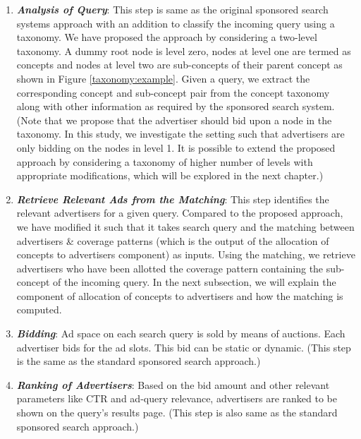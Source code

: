 \begin{enumerate}[label=(\roman*).]
\item \textbf{{\em Analysis of Query}}: This step is same as the original sponsored search systems approach with an addition to classify the incoming query using a taxonomy. We have proposed the approach by considering  a two-level taxonomy. A dummy root node is level zero, nodes at level one are termed as concepts and nodes at level two are sub-concepts of their parent concept as shown in Figure \ref{taxonomy:example}. Given a query, we extract the corresponding concept and sub-concept pair from the concept taxonomy along with other information as required by the sponsored search system. (Note that we propose that the advertiser should bid upon a node in the taxonomy. In this study, we investigate the setting such that advertisers are only bidding on the nodes in level 1. It is possible to extend the  proposed approach by considering a taxonomy of higher number of levels with appropriate modifications,  which will be explored in the next chapter.)

\item \textbf{{\em Retrieve Relevant Ads from the Matching}}: This step identifies the relevant advertisers for a given query. Compared to the proposed approach, we have modified it such that it takes search query and the matching between advertisers \& coverage patterns (which is the output of the allocation of concepts to advertisers component) as inputs. Using the matching, we retrieve advertisers who have been allotted the coverage pattern containing the sub-concept of the incoming query. In the next subsection, we will explain the component of allocation of concepts to advertisers and how the matching is computed.



\item \textbf{{\em Bidding}}: Ad space on each search query is sold by means of auctions. Each advertiser bids for the ad slots. This bid can be static or dynamic. (This step is the same as the standard sponsored search approach.) 


\item \textbf{{\em Ranking of  Advertisers}}: Based on the bid amount and other relevant parameters like CTR and ad-query relevance, advertisers are ranked to be shown on the query's results page. (This step is also same as the standard sponsored search approach.)



\end{enumerate}
